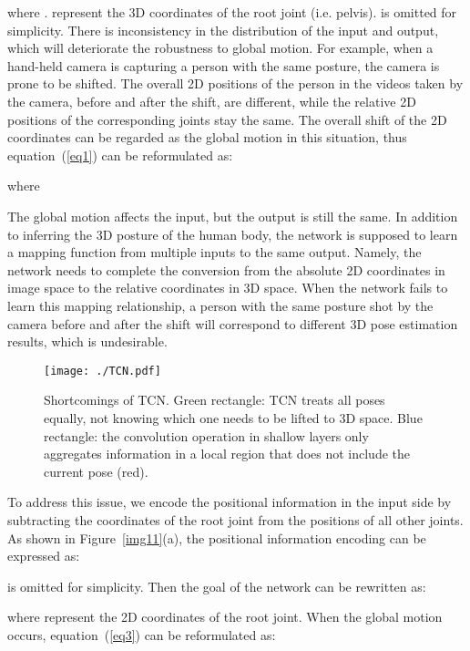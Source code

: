 \documentclass[sigconf]{acmart}
\begin{document}
where .  represent the 3D coordinates of the root joint (i.e. pelvis).  is omitted for simplicity. There is inconsistency in the distribution of the input and output, which will deteriorate the robustness to global motion. For example, when a hand-held camera is capturing a person with the same posture, the camera is prone to be shifted. The overall 2D positions of the person in the videos taken by the camera, before and after the shift, are different, while the relative 2D positions of the corresponding joints stay the same. The overall shift of the 2D coordinates can be regarded as the global motion in this situation, thus equation~(\ref{eq1}) can be reformulated as:

where


The global motion affects the input, but the output is still the same. In addition to inferring the 3D posture of the human body, the network is supposed to learn a mapping function from multiple inputs to the same output. Namely, the network needs to complete the conversion from the absolute 2D coordinates in image space to the relative coordinates in 3D space. When the network 
fails to learn this mapping relationship, a person with the same posture shot by the camera before and after the shift will correspond to different 3D pose estimation results, which is undesirable.

\begin{figure}
  \centering
  \texttt{[image: ./TCN.pdf]}
  \vspace{-0.8cm}
  \caption{Shortcomings of TCN. Green rectangle: TCN treats all poses equally, not knowing which one needs to be lifted to 3D space. Blue rectangle: the convolution operation in shallow layers only aggregates information in a local region that does not include the current pose (red).}
  \vspace{-0.2cm}
  \label{img4}
\end{figure}

To address this issue, we encode the positional information in the input side by subtracting the coordinates of the root joint from the positions of all other joints. As shown in Figure~\ref{img11}(a), the positional information encoding can be expressed as:

 is omitted for simplicity. Then the goal of the network can be rewritten as:

where  represent the 2D coordinates of the root joint. When the global motion occurs, equation~(\ref{eq3}) can be reformulated as:
\end{document}
